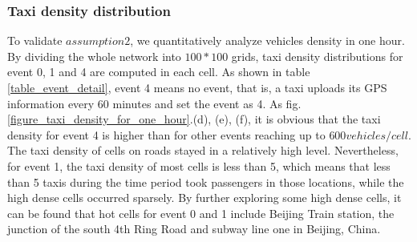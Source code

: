 \subsubsection{Taxi density distribution}
\label{section_taxi_denstiy_distribution}

To validate $assumption 2$, we quantitatively analyze vehicles density in one hour. By dividing the whole network into $100*100$ grids, taxi density distributions for event 0, 1 and 4 are computed in each cell. As shown in table \ref{table_event_detail}, event 4 means no event, that is, a taxi uploads its GPS information every 60 minutes and set the event as 4. As fig.\ref{figure_taxi_density_for_one_hour}.(d), (e), (f), it is obvious that the taxi density for event 4 is higher than for other events reaching up to $600 vehicles/cell$. The taxi density of cells on roads stayed in a relatively high level. Nevertheless, for event 1, the taxi density of most cells is less than 5, which means that less than 5 taxis during the time period took passengers in those locations, while the high dense cells occurred sparsely. By further exploring some high dense cells, it can be found that hot cells for event 0 and 1 include Beijing Train station, the junction of the south 4th Ring Road and subway line one in Beijing, China.


